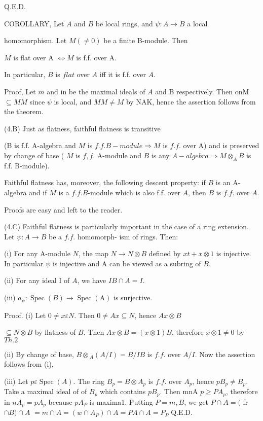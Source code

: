 Q.E.D.

COROLLARY, Let $A$ and $B$ be local rings, and $\psi: A \rightarrow B$ a local

homomorphism. Let $M(\neq 0)$ be a finite B-module. Then

$M$ is flat over A $\Leftrightarrow M$ is f.f. over A.

In particular, $B$ is $f l a t$ over $A$ iff it is f.f. over $A$.

Proof, Let $m$ and in be the maximal ideals of $A$ and B respectively. Then onM $\subseteq M M$ since $\psi$ is local, and $M M \neq M$ by NAK, hence the assertion follows from the theorem.

(4.B) Just as flatness, faithful flatness is transitive

(B is f.f. A-algebra and $M$ is $f . f . B-m o d u l e \Rightarrow M$ is $f . f .$ over A) and is preserved by change of base ( $M$ is $f, f$. A-module and $B$ is any $A-a l g e b r a \Rightarrow M \otimes_{A} B$ is f.f. B-module).

Faithful flatness has, moreover, the following descent property: if $B$ is an A-algebra and if $M$ is a $f . f . B$-module which is also f.f. over $A$, then $B$ is $f . f$. over $A$.

Proofs are easy and left to the reader.

(4.C) Faithful flatness is particularly important in the case of a ring extension. Let $\psi: A \rightarrow B$ be a $f . f$. homomorph- ism of rings. Then:

(i) For any A-module $N$, the map $N \rightarrow N \otimes B$ defined by $x t+x \otimes 1$ is injective. In particular $\psi$ is injective and A can be viewed as a subring of $B$.

(ii) For any ideal I of $A$, we have $I B \cap A=I$.

(iii) $a_{\psi}: \operatorname{Spec}(B) \rightarrow \operatorname{Spec}(\mathrm{A})$ is surjective.

Proof. (i) Let $0 \neq x \varepsilon N$. Then $0 \neq A x \subseteq N$, hence $A x \otimes B$

$\subseteq N \otimes B$ by flatness of $B$. Then $A x \otimes B=(x \otimes 1) B$, therefore $x \otimes 1 \neq 0$ by $T h .2$

(ii) By change of base, $B \otimes{ }_{A}(A / I)=B / I B$ is $f . f$. over $A / I$. Now the assertion follows from (i).

(iii) Let $p \varepsilon \operatorname{Spec}(A)$. The ring $B_{p}=B \otimes A_{p}$ is $f . f$. over $A_{p}$, hence $p B_{p} \neq B_{p}$. Take a maximal ideal of of $B_{p}$ which contains $p B_{p}$. Then mnA $p \geq P A_{p}$, therefore in $n A_{p}=p A_{p}$ because $p A_{P}$ is maxima1. Putting $P=m, B$, we get $P \cap A=($ fr $\cap B) \cap A$ $=m \cap A=\left(w \cap A_{P}\right) \cap A=P A \cap A=P_{P}$ Q.E.D.

